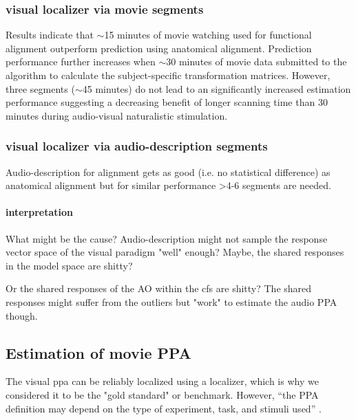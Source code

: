 \subsubsection{visual localizer via movie segments}

%
Results indicate that $\sim$15 minutes of movie watching used for functional
alignment outperform prediction using anatomical alignment.
%
Prediction performance further increases when $\sim$30 minutes of movie data
submitted to the algorithm to calculate the subject-specific transformation
matrices.
%
However, three segments ($\sim$45 minutes) do not lead to an significantly
increased estimation performance suggesting a decreasing benefit of longer
scanning time than 30 minutes during audio-visual naturalistic stimulation.


\subsubsection{visual localizer via audio-description segments}

Audio-description for alignment gets as good (i.e. no statistical difference) as
anatomical alignment but for similar performance >4-6 segments are needed.


\paragraph{interpretation}
%
What might be the cause?
%
Audio-description might not sample the response vector space of the visual
paradigm "well" enough?
%
Maybe, the shared responses in the model space are shitty?

Or the shared responses of the AO within the \ac{cfs} are shitty?
%
The shared responses might suffer from the outliers but "work" to estimate the
audio PPA though.



\subsection{Estimation of movie PPA}


The visual \ac{ppa} can be reliably localized using a localizer, which is why we
considered it to be the "gold standard" or benchmark.
%
However, ``the PPA definition may depend on the type of experiment, task, and
stimuli used'' \citep{weiner2018defining}.

